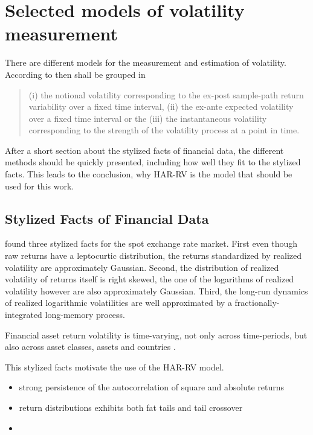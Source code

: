 
\section{Selected models of volatility measurement}

There are different models for the measurement and estimation of volatility. According to \citeauthor{andersen2001} then shall be grouped in \begin{quote}
(i) the notional volatility corresponding to the ex-post sample-path return variability over a fixed time interval, (ii) the ex-ante expected volatility over a fixed time interval or the (iii) the instantaneous volatility corresponding to the strength of the volatility process at a point in time.
\end{quote}
After a short section about the stylized facts of financial data, the different methods should be quickly presented, including how well they fit to the stylized facts. This leads to the conclusion, why HAR-RV is the model that should be used for this work.


\subsection{Stylized Facts of Financial Data}

\citeauthor{andersen2001} found three stylized facts for the spot exchange rate market. First even though raw returns have a leptocurtic distribution, the returns standardized by realized volatility are approximately Gaussian. Second, the distribution of realized volatility of returns itself is right skewed, the one of the logarithms of realized volatility however are also approximately Gaussian. Third, the long-run dynamics of realized logarithmic volatilities are well approximated by a fractionally-integrated long-memory process. 

Financial asset return volatility is time-varying,  not only across time-periods, but also across asset classes, assets and countries \parencite{andersen2001}.

This stylized facts motivate the use of the HAR-RV model.

\begin{itemize}
\item strong persistence of the autocorrelation of square and absolute returns \parencite{jiang2003}
\item return distributions exhibits both fat tails and tail crossover \parencite{jiang2003}
\item 
\end{itemize}

